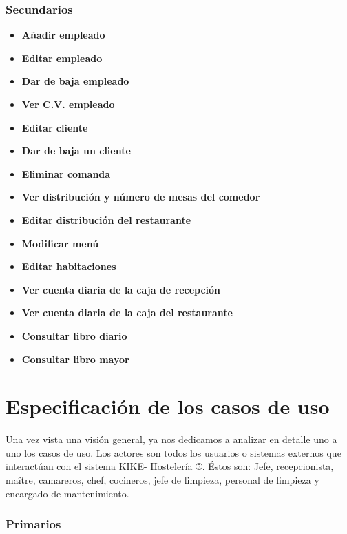 \documentclass[spanish,a4paper,11pt, twoside]{report}	%
\begin{document}
\section{Secundarios}			%
	\begin{itemize}
	\item \textbf{Añadir empleado}
	\item \textbf{Editar empleado}
	\item \textbf{Dar de baja empleado}
	\item \textbf{Ver C.V. empleado}
	\item \textbf{Editar cliente}
	\item \textbf{Dar de baja un cliente}
	\item \textbf{Eliminar comanda}
	\item \textbf{Ver distribución y número de mesas del comedor}
	\item \textbf{Editar distribución del restaurante}
	\item \textbf{Modificar menú}
	\item \textbf{Editar habitaciones}
	\item \textbf{Ver cuenta diaria de la caja de recepción}
	\item \textbf{Ver cuenta diaria de la caja del restaurante}
	\item \textbf{Consultar libro diario}
	\item \textbf{Consultar libro mayor}
	\end{itemize}


\newpage
\mbox{}
\thispagestyle{empty}						%
\newpage

\setcounter{section}{0}

\part{Especificación de los casos de uso} %
	Una vez vista una visión general, ya nos dedicamos a analizar en detalle uno a
	uno los casos de uso. Los actores son todos los usuarios o sistemas externos que
	interactúan con el sistema KIKE- Hostelería ®. Éstos son: Jefe, recepcionista,
	maître, camareros, chef, cocineros, jefe de limpieza, personal de limpieza y
	encargado de mantenimiento.

\section{Primarios}		 			
\end{document}
